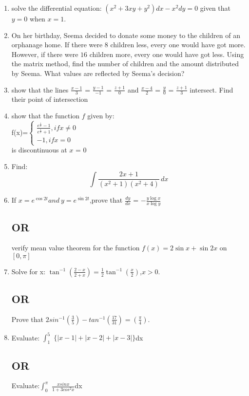 \documentclass{article}
\begin{document}
\begin{enumerate}
   \item solve the differential equation:
	   $(x^2+3xy+y^2)dx-x^2dy=0$ given that $y=0$ when $x=1$.

    \item On her birthday, Seema decided to donate some money to the children of an orphanage home. If there were $8$ children less, every one would have got  more. However, if there were $16$ children more, every one would have got  less. Using the matrix method, find the number of children and the amount distributed by Seema. What values are reflected by Seema's decision?

    \item show that the lines $\frac {x-1} {3} $ = $\frac {y-1} {-1} $ = $\frac {z+1} {0} $ and $\frac {x-4} {2} $ = $\frac {y} {0} $ = $\frac {z+1} {3} $ intersect.
	      Find their point of intersection
	
     \item show that the function $f$ given by: \\
f(x)=$\begin{cases}\frac{e^{\frac{1}{x}}-1}{e^{\frac{1}{x}}+1}, if x\neq0\\    {-1}, if x = 0 \end{cases}$ \\is discontinuous at $x$ = $0$

     \item Find:\[\int  \frac {2x+1} {(x^2+1) (x^2+4)}\,dx\] 

     \item If $ x = e^{\cos2t} and  \ y = e^{\sin2t} $,prove that $ \frac {dy} {dx} $ = $ -\frac{y \log x} {x \log y}	$ \subsection*{\centering OR}verify mean value theorem for the function $f(x)=2\sin x+\sin 2x$ on $[0,\pi ]$
	

     \item Solve for x: $\tan^{-1}\left(\frac {2 - x}{2 + x}\right) = \frac {1}{2} \tan^{-1}\left(\frac {x}{2}\right)$,$x > 0$. \subsection*{\centering OR} Prove that $2sin^{-1}\left(\frac{3}{5}\right)-t    an^{-1}\left(\frac{17}{31}\right)=\left(\frac{\pi}{4}\right)$.

     \item Evaluate: $\int_{1}^{5}$ $\{|x - 1| + |x - 2| + |x - 
	     3|\}$dx \subsection*{\centering OR}Evaluate:$\int_{0}^{\pi}$ $ \frac {xsinx} {1+3cos^2x} $dx	     


\end{enumerate}
\end{document}
